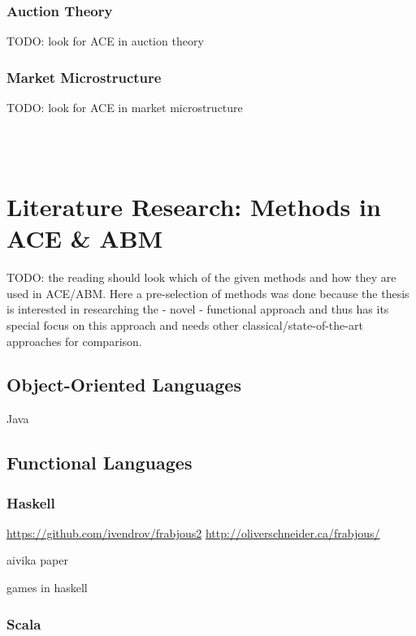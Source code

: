 \documentclass{article}
\begin{document}
\subsubsection{Auction Theory}
TODO: look for ACE in auction theory

\subsubsection{Market Microstructure}
TODO: look for ACE in market microstructure

\cite{Budish2015} \\
\cite{aldridge_high_frequency_2009} \\


\section{Literature Research: Methods in ACE \& ABM}
TODO: the reading should look which of the given methods and how they are used in ACE/ABM. Here a pre-selection of methods was done because the thesis is interested in researching the - novel - functional approach and thus has its special focus on this approach and needs other classical/state-of-the-art approaches for comparison.

\subsection{Object-Oriented Languages}
Java \\

\subsection{Functional Languages}
\subsubsection{Haskell}
\url{https://github.com/ivendrov/frabjous2}
\cite{Schneider_2012}
\url{http://oliverschneider.ca/frabjous/}
\cite{Vendrov_2014}

\cite{Nilsson_2014}
\cite{Nilsson_2003}

\cite{Sulzmann_2007}

\cite{bauer_adaptation_2011}

\cite{Jankovic_2007}


aivika paper

games in haskell

\subsubsection{Scala}
\end{document}
